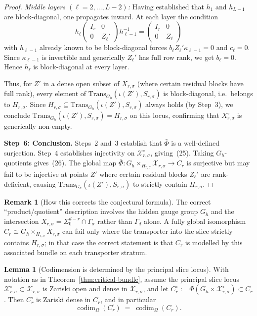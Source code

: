 \documentclass{article}
\newcommand{\codim}{\operatorname{codim}}
\theoremstyle{definition}
\newtheorem{lemma}[theorem]{Lemma}
\newtheorem{remark}[theorem]{Remark}
\begin{document}
\begin{proof}
\emph{Middle layers $(\ell = 2, \dots, L{-}2)$:}  Having established that $h_1$ and $h_{L-1}$ are block-diagonal, one propagates inward.  At each layer the condition
\[
h_\ell \begin{pmatrix} I_r & 0 \\ 0 & Z_\ell' \end{pmatrix} h_{\ell-1}^{-1}
= \begin{pmatrix} I_r & 0 \\ 0 & Z_\ell \end{pmatrix}
\]
with $h_{\ell-1}$ already known to be block-diagonal forces $b_\ell Z_\ell' \kappa_{\ell-1} = 0$ and $c_\ell = 0$.  Since $\kappa_{\ell-1}$ is invertible and generically $Z_\ell'$ has full row rank, we get $b_\ell = 0$.  Hence $h_\ell$ is block-diagonal at every layer.

Thus, for $Z'$ in a dense open subset of $X_{r,\sigma}$ (where certain residual blocks have full rank), every element of $\mathrm{Trans}_{G_h}(\iota(Z'), S_{r,\sigma})$ is block-diagonal, i.e.\ belongs to $H_{r,\sigma}$.  Since $H_{r,\sigma} \subseteq \mathrm{Trans}_{G_h}(\iota(Z'), S_{r,\sigma})$ always holds (by Step~3), we conclude $\mathrm{Trans}_{G_h}(\iota(Z'), S_{r,\sigma}) = H_{r,\sigma}$ on this locus, confirming that $X_{r,\sigma}^{\circ}$ is generically non-empty.

\medskip
\textbf{Step~6: Conclusion.}
Steps~2 and~3 establish that $\bar\Phi$ is a well-defined surjection.  Step~4 establishes injectivity on $\mathcal X_{r,\sigma}^{\circ}$, giving~(25).  Taking $G_h$-quotients gives~(26).  The global map $\bar\Phi \colon G_h \times_{H_{r,\sigma}} \mathcal X_{r,\sigma} \to C_r$ is surjective but may fail to be injective at points $Z'$ where certain residual blocks $Z_\ell'$ are rank-deficient, causing $\mathrm{Trans}_{G_h}(\iota(Z'), S_{r,\sigma})$ to strictly contain $H_{r,\sigma}$.
\end{proof}

\begin{remark}[How this corrects the conjectural formula]
The correct ``product/quotient'' description involves the hidden gauge group $G_h$ and the intersection $X_{r,\sigma} = \Sigma_0^{d-r} \cap \Gamma_\sigma$ rather than $\Gamma_d$ alone.  A fully global isomorphism $C_r \cong G_h \times_{H_{r,\sigma}} X_{r,\sigma}$ can fail only where the transporter into the slice strictly contains $H_{r,\sigma}$; in that case the correct statement is that $C_r$ is modelled by this associated bundle on each transporter stratum.
\end{remark}
\begin{lemma}[Codimension is determined by the principal slice locus]
\label{lem:codim-principal-locus}
With notation as in Theorem~\ref{thm:critical-bundle}, assume the principal slice locus
$\mathcal X_{r,\sigma}^{\circ}\subset \mathcal X_{r,\sigma}$ is Zariski open and dense in $\mathcal X_{r,\sigma}$, and let
$C_r^{\circ}:=\Phi(G_h\times \mathcal X_{r,\sigma}^{\circ})\subset C_r$.
Then $C_r^{\circ}$ is Zariski dense in $C_r$, and in particular
\[
\codim_{\Omega}(C_r^{\circ}) \;=\; \codim_{\Omega}(C_r).
\]
\end{lemma}
\end{document}
